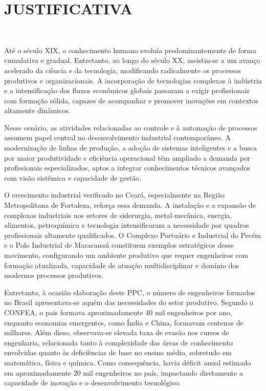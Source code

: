 \section{JUSTIFICATIVA}
\label{JUSTIFICATIVA}
~ 

Até o século XIX, o conhecimento humano evoluía predominantemente de forma cumulativa e gradual. Entretanto, ao longo do século XX, assistiu-se a um avanço acelerado da ciência e da tecnologia, modificando radicalmente os processos produtivos e organizacionais. A incorporação de tecnologias complexas à indústria e a intensificação dos fluxos econômicos globais passaram a exigir profissionais com formação sólida, capazes de acompanhar e promover inovações em contextos altamente dinâmicos.

Nesse cenário, as atividades relacionadas ao controle e à automação de processos assumem papel central no desenvolvimento industrial contemporâneo. A modernização de linhas de produção, a adoção de sistemas inteligentes e a busca por maior produtividade e eficiência operacional têm ampliado a demanda por profissionais especializados, aptos a integrar conhecimentos técnicos avançados com visão sistêmica e capacidade de gestão.

O crescimento industrial verificado no Ceará, especialmente na Região Metropolitana de Fortaleza, reforça essa demanda. A instalação e a expansão de complexos industriais nos setores de siderurgia, metal-mecânica, energia, alimentos, petroquímica e tecnologia intensificaram a necessidade por quadros profissionais altamente qualificados. O Complexo Portuário e Industrial do Pecém e o Polo Industrial de Maracanaú constituem exemplos estratégicos desse movimento, configurando um ambiente produtivo que requer engenheiros com formação atualizada, capacidade de atuação multidisciplinar e domínio dos modernos processos produtivos.


Entretanto, à ocasião elaboração deste PPC, o número de engenheiros formados no Brasil apresentava-se aquém das necessidades do setor produtivo. Segundo o CONFEA, o país formava aproximadamente 40 mil engenheiros por ano, enquanto economias emergentes, como Índia e China, formavam centenas de milhares. Além disso, observava-se elevada taxa de evasão nos cursos de engenharia, relacionada tanto à complexidade das áreas de conhecimento envolvidas quanto às deficiências de base no ensino médio, sobretudo em matemática, física e química. Como consequência, havia déficit anual estimado em aproximadamente 20 mil engenheiros no país, impactando diretamente a capacidade de inovação e o desenvolvimento tecnológico.

